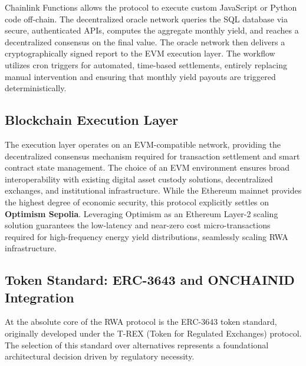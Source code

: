 \documentclass{Resources/bdlt-project}
\begin{document}
Chainlink Functions allows the protocol to execute custom JavaScript or Python code off-chain. The decentralized oracle network queries the SQL database via secure, authenticated APIs, computes the aggregate monthly yield, and reaches a decentralized consensus on the final value. The oracle network then delivers a cryptographically signed report to the EVM execution layer. The workflow utilizes cron triggers for automated, time-based settlements, entirely replacing manual intervention and ensuring that monthly yield payouts are triggered deterministically.

\subsection{Blockchain Execution Layer}
The execution layer operates on an EVM-compatible network, providing the decentralized consensus mechanism required for transaction settlement and smart contract state management. The choice of an EVM environment ensures broad interoperability with existing digital asset custody solutions, decentralized exchanges, and institutional infrastructure. While the Ethereum mainnet provides the highest degree of economic security, this protocol explicitly settles on \textbf{Optimism Sepolia}. Leveraging Optimism as an Ethereum Layer-2 scaling solution guarantees the low-latency and near-zero cost micro-transactions required for high-frequency energy yield distributions, seamlessly scaling RWA infrastructure.

\subsection{Token Standard: ERC-3643 and ONCHAINID Integration}
At the absolute core of the RWA protocol is the ERC-3643 token standard, originally developed under the T-REX (Token for Regulated Exchanges) protocol. The selection of this standard over alternatives represents a foundational architectural decision driven by regulatory necessity.
\end{document}
